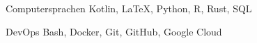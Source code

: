 

\begin{cvpairs}

  
\cvpair
    {Computersprachen} %
    {Kotlin, LaTeX, Python, R, Rust, SQL} %


\cvpair
    {DevOps} %
    {Bash, Docker, Git, GitHub, Google Cloud} %

\end{cvpairs}